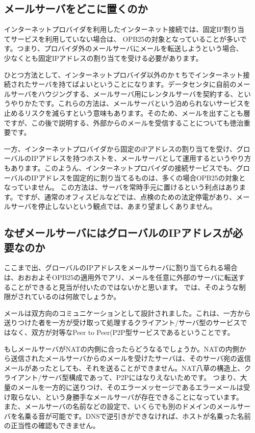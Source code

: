 {\subsection{メールサーバをどこに置くのか}
インターネットプロバイダを利用したインターネット接続では、固定IP割り当てサービスを利用していない場合は、
OPB25の対象となっていることが多いです。つまり、プロバイダ外のメールサーバにメールを転送しようという場合、
少なくとも固定IPアドレスの割り当てを受ける必要があります。

ひとつ方法として、インターネットプロバイダ以外のかｔちでインターネット接続されたサーバを持てばよいということになります。データセンタに自前のメールサーバをハウジングする、メールサーバ用にレンタルサーバを契約する、というやりかたです。これらの方法は、メールサーバという泊められないサービスを止めるリスクを減らすという意味もあります。そのため、メールを出すことも層ですが、この後で説明する、外部からのメールを受信することについても徳治重要です。

一方、インターネットプロバイダから固定のiPアドレスの割り当てを受け、グローバルのIPアドレスを持つホストを、メールサーバとして運用するというやり方もあります。このようん、インターネットプロバイダの接続サービスでも、グローバルのIPアドレスを固定的に割り当てるものは、多くの場合OPB25の対象となっていません。
この方法は、サーバを常時手元に置けるという利点はあります。ですが、通常のオフィスビルなどでは、点検のための法定停電があり、メールサーバを停止しないという観点では、あまり望ましくありません。

\subsection{なぜメールサーバにはグローバルのIPアドレスが必要なのか}
ここまで出、グローバルのIPアドレスをメールサーバに割り当てられる場合は、おおおよそOPB25の適用外でアリ、メールを任意に外部のサーバに転送することができると見当が付いたのではないかと思います。
では、そのような制限がされているのは何故でしょうか。

メールは双方向のコミュニケーションとして設計されました。これは、一方から送りつけた者を一方が受け取って処理するクライアント/サーバ型のサービスではなく、双方が対等なPeer to Peer(P2P型サービスであるということです。

もしメールサーバがNATの内側に合ったらどうなるでしょうか。NATの内側から送信されたメールサーバからのメールを受けたサーバは、そのサーバ宛の返信メールがあったとしても、それを送ることができません。NAT八草の構造上、クライアント/サーバ型構成であって、P2Pにはなりえないためです。
つまり、大量のメールを一方的に送りつけ、そのエラーメッセージであるエラーメールは受け取らない、という身勝手なメールサーバが存在できることになっています。
また、メールサーバの名前などの設定で、いくらでも別のドメインのメールサーバを名乗る音が可能です。DNSで逆引きができなければ、ホストが名乗った名前の正当性の確認もできません。

}

